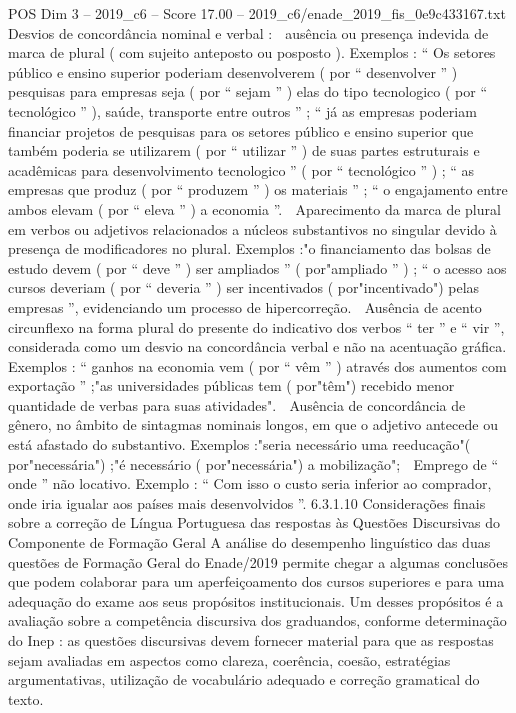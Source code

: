 \begin{textsample}{POS Dim 3 – 2019\_c6 – Score 17.00 – 2019\_c6/enade\_2019\_fis\_0e9c433167.txt}
Desvios de concordância nominal e verbal :  ausência ou presença indevida de marca de plural ( com sujeito anteposto ou posposto ).
Exemplos : “ Os setores público e ensino superior poderiam desenvolverem ( por “ desenvolver ” ) pesquisas para empresas seja ( por “ sejam ” ) elas do tipo tecnologico ( por “ tecnológico ” ), saúde, transporte entre outros ” ; “ já as empresas poderiam financiar projetos de pesquisas para os setores público e ensino superior que também poderia se utilizarem ( por “ utilizar ” ) de suas partes estruturais e acadêmicas para desenvolvimento tecnologico ” ( por “ tecnológico ” ) ; “ as empresas que produz ( por “ produzem ” ) os materiais ” ; “ o engajamento entre ambos elevam ( por “ eleva ” ) a economia ”.  Aparecimento da marca de plural em verbos ou adjetivos relacionados a núcleos substantivos no singular devido à presença de modificadores no plural.
Exemplos :"o financiamento das bolsas de estudo devem ( por “ deve ” ) ser ampliados ” ( por"ampliado ” ) ; “ o acesso aos cursos deveriam ( por “ deveria ” ) ser incentivados ( por"incentivado") pelas empresas ”, evidenciando um processo de hipercorreção.  Ausência de acento circunflexo na forma plural do presente do indicativo dos verbos “ ter ” e “ vir ”, considerada como um desvio na concordância verbal e não na acentuação gráfica.
Exemplos : “ ganhos na economia vem ( por “ vêm ” ) através dos aumentos com exportação ” ;"as universidades públicas tem ( por"têm") recebido menor quantidade de verbas para suas atividades".  Ausência de concordância de gênero, no âmbito de sintagmas nominais longos, em que o adjetivo antecede ou está afastado do substantivo.
Exemplos :"seria necessário uma reeducação"( por"necessária") ;"é necessário ( por"necessária") a mobilização";  Emprego de “ onde ” não locativo.
Exemplo : “ Com isso o custo seria inferior ao comprador, onde iria igualar aos países mais desenvolvidos ”. 6.3.1.10 Considerações finais sobre a correção de Língua Portuguesa das respostas às Questões Discursivas do Componente de Formação Geral A análise do desempenho linguístico das duas questões de Formação Geral do Enade/2019 permite chegar a algumas conclusões que podem colaborar para um aperfeiçoamento dos cursos superiores e para uma adequação do exame aos seus propósitos institucionais.
Um desses propósitos é a avaliação sobre a competência discursiva dos graduandos, conforme determinação do Inep : as questões discursivas devem fornecer material para que as respostas sejam avaliadas em aspectos como clareza, coerência, coesão, estratégias argumentativas, utilização de vocabulário adequado e correção gramatical do texto.

\end{textsample}
